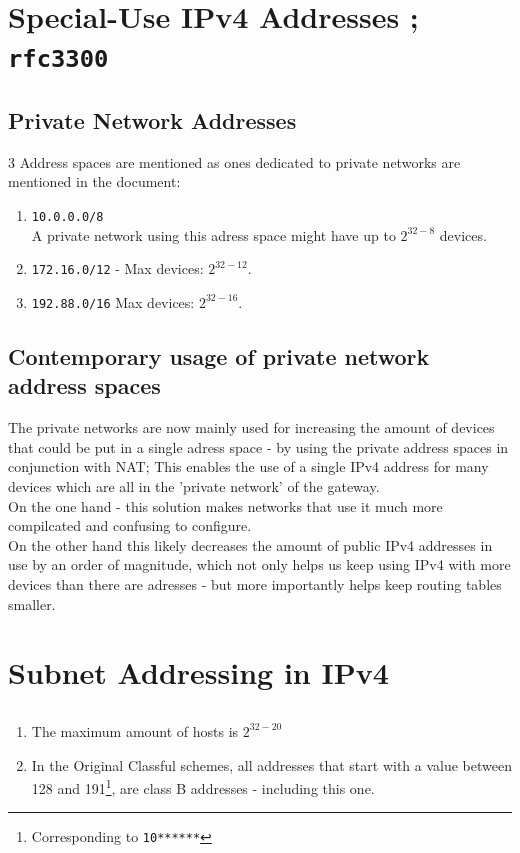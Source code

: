 \section{Special-Use IPv4 Addresses ; \texttt{rfc3300}}
\subsection{Private Network Addresses}
3 Address spaces are mentioned as ones
dedicated to private networks are mentioned
in the document:
\begin{enumerate}
	\item \texttt{10.0.0.0/8}\\
		A private network using this adress space might have up to $2^{32-8}$ devices.
	\item \texttt{172.16.0/12} -
		Max devices: $2^{32-12}$.
	\item \texttt{192.88.0/16}
		Max devices: $2^{32-16}$.
\end{enumerate}

\subsection{Contemporary usage of private network address spaces}

The private networks are now mainly used for increasing the amount
of devices that could be put in a single adress space
- by using the private address spaces in conjunction with NAT;
This enables the use of a single IPv4 address for many devices
which are all in the 'private network' of the gateway.\\

On the one hand - this solution makes networks that use it
much more compilcated and confusing to configure.\\
On the other hand this likely decreases the amount 
of public IPv4 addresses in use by an order of magnitude,
which not only helps us keep using IPv4 with more devices than there are
adresses - but more importantly helps keep routing tables smaller.

\section{Subnet Addressing in IPv4}
\subsection{}
\begin{enumerate}[label=\alph*.]
	\item The maximum amount of hosts is $2^{32-20}$
	\item In the Original Classful schemes,
		all addresses that start with a value between 128 and 191\footnote{Corresponding to \texttt{10******}},
		are class B addresses - including this one.
\end{enumerate}
